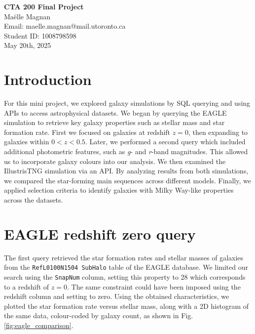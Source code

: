 \documentclass[10pt]{article}
\begin{document}
\begin{titlepage}
    \centering
    {\Huge \textbf{CTA 200 Final Project}} \\[2cm] %
    
    {\large Maëlle Magnan} \\[0.5cm] %
    Email: maelle.magnan@mail.utoronto.ca \\[0.5cm] %
    Student ID: 1008798598 \\[2cm] %

    {\large May 20th, 2025} \\[3cm] %

\end{titlepage}


\section*{Introduction}
For this mini project, we explored galaxy simulations by SQL querying and using APIs to access astrophysical datasets. We began by querying the EAGLE simulation to retrieve key galaxy properties such as stellar mass and star formation rate. First we focused on galaxies at redshift $z = 0 $, then expanding to galaxies within $0 < z < 0.5 $. Later, we performed a second query which included additional photometric features, such as \textit{g}- and \textit{r}-band magnitudes. This allowed us to incorporate galaxy colours into our analysis. We then examined the IllustrisTNG simulation via an API. By analyzing results from both simulations, we compared the star-forming main sequences across different models. Finally, we applied selection criteria to identify galaxies with Milky Way-like properties across the datasets.



\section{EAGLE redshift zero query}
The first query retrieved the star formation rates and stellar masses of galaxies from the \texttt{RefL0100N1504 SubHalo} table of the
EAGLE database. We limited our search using the \texttt{SnapNum} column, setting this property to 28 which corresponds to a redshift of $z=0$. The same constraint could have been imposed using the redshift column and setting to zero. Using the obtained characteristics, we plotted the star formation rate versus stellar mass, along with a 2D histogram of the same data, colour-coded by galaxy count, as shown in Fig. \ref{fig:eagle_comparison}. 
\end{document}
